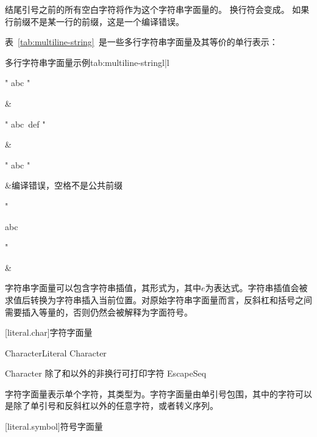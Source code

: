 结尾引号之前的所有空白字符将作为这个字符串字面量的。
换行符会变成。
如果行前缀不是某一行的前缀，这是一个编译错误。

\enterexample
表~\ref{tab:multiline-string}~是一些多行字符串字面量及其等价的单行表示：

\begin{floattable}{多行字符串字面量示例}{tab:multiline-string}{l|l}
\topline
\begin{codeblock}
"
abc
"
\end{codeblock}
&\\
\hline

\begin{codeblock}
"
abc\
def
"
\end{codeblock}
&\\
\hline

\begin{codeblock}
"
abc
   "
\end{codeblock}
&编译错误，空格不是公共前缀\\
\hline

\begin{codeblock}
"

abc

"
\end{codeblock}
&\\
\hline

\end{floattable}
\exitexample

\pnum
字符串字面量可以包含字符串插值，其形式为，其中$e$为表达式。字符串插值会被求值后转换为字符串插入当前位置。对原始字符串字面量而言，反斜杠和括号之间需要插入等量的，否则仍然会被解释为字面符号。

[literal.char]{字符字面量}

\begin{bnf}{CharacterLiteral}
     Character 
\end{bnf}

\begin{bnf}{Character}
    \textnormal{除了\terminal{\textbackslash}和以外的非换行可打印字符} \br
    EscapeSeq
\end{bnf}

\pnum
字符字面量表示单个字符，其类型为。字符字面量由单引号包围，其中的字符可以是除了单引号和反斜杠以外的任意字符，或者转义序列。

[literal.symbol]{符号字面量}

